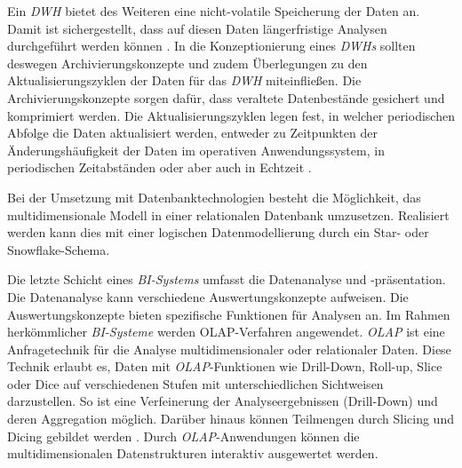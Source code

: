 Ein \textit{\acrlong{DWH}} bietet des Weiteren eine nicht-volatile Speicherung der Daten an. Damit ist sichergestellt, dass auf diesen Daten längerfristige Analysen durchgeführt werden können \cite[vgl.][136]{linden_geschaftsmodellbasierte_2016}.
In die Konzeptionierung eines \textit{\acrlong{DWH}s} sollten deswegen Archivierungskonzepte und zudem Überlegungen zu den Aktualisierungszyklen der Daten für das \textit{\acrshort{DWH}}
miteinfließen. Die Archivierungskonzepte sorgen dafür, dass veraltete Datenbestände gesichert und komprimiert werden.
Die Aktualisierungszyklen legen fest, in welcher periodischen Abfolge die Daten aktualisiert werden, entweder zu Zeitpunkten der Änderungshäufigkeit
der Daten im operativen Anwendungssystem, in periodischen Zeitabständen oder aber auch in Echtzeit \cite[vgl.][137]{linden_geschaftsmodellbasierte_2016}.

Bei der Umsetzung mit Datenbanktechnologien besteht die Möglichkeit, das multidimensionale Modell in einer relationalen Datenbank umzusetzen.  
Realisiert werden kann dies mit einer logischen Datenmodellierung durch ein Star- oder Snowflake-Schema\cite[vgl.][177 f.]{linden_geschaftsmodellbasierte_2016}.




Die letzte Schicht eines \textit{\acrshort{BI}-Systems} umfasst die Datenanalyse und -präsentation. Die Datenanalyse kann verschiedene Auswertungskonzepte aufweisen.
Die Auswertungskonzepte bieten spezifische Funktionen für Analysen an. Im Rahmen herkömmlicher \textit{\acrshort{BI}-Systeme} werden \acrfull{OLAP}-Verfahren angewendet. 
\textit{\acrshort{OLAP}} ist eine Anfragetechnik für die Analyse multidimensionaler oder relationaler Daten. Diese Technik erlaubt es, Daten mit \textit{\acrshort{OLAP}}-Funktionen 
wie Drill-Down, Roll-up, Slice oder Dice auf verschiedenen Stufen mit unterschiedlichen Sichtweisen darzustellen. So ist eine Verfeinerung der Analyseergebnissen (Drill-Down) und 
deren Aggregation möglich. Darüber hinaus können Teilmengen durch Slicing und Dicing gebildet werden \cite[vgl.][283 f.]{abts_grundkurs_2017}. 
Durch \textit{\acrshort{OLAP}}-Anwendungen können die multidimensionalen Datenstrukturen interaktiv ausgewertet werden.


